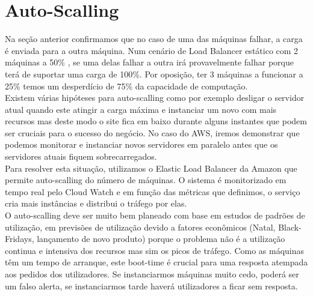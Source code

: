 \section{Auto-Scalling}
Na seção anterior confirmamos que no caso de uma das máquinas falhar, a carga é enviada para a outra máquina. Num cenário de Load Balancer estático com  2 máquinas a 50\% , se uma delas falhar a outra irá provavelmente falhar porque terá de suportar uma carga de 100\%. Por oposição, ter 3 máquinas a funcionar a 25\% temos um desperdício de 75\% da capacidade de computação.\\
Existem várias hipóteses para auto-scalling como por exemplo desligar o servidor atual quando este atingir a carga máxima e instanciar um novo com mais recursos mas deste modo o site fica em baixo durante alguns instantes que podem ser cruciais para o sucesso do negócio. No caso do AWS, iremos demonstrar que podemos monitorar e instanciar novos servidores em paralelo antes que os servidores atuais fiquem sobrecarregados. \\
Para resolver esta situação, utilizamos o Elastic Load Balancer da Amazon que permite auto-scalling do número de máquinas. O sistema é monitorizado em tempo real pelo 
Cloud Watch e em função das métricas que definimos, o serviço cria mais instâncias e distribui o tráfego por elas.\\
O auto-scalling deve ser muito bem planeado com base em estudos de padrões de utilização, em previsões de utilização devido a fatores econômicos (Natal, Black-Fridays, lançamento de novo produto) porque o problema não é a utilização continua e intensiva dos recursos mas sim os picos de tráfego. Como as máquinas têm um tempo de arranque, este boot-time é crucial para uma resposta atempada aos pedidos dos utilizadores. Se instanciarmos máquinas muito cedo, poderá ser um falso alerta, se instanciarmos tarde haverá utilizadores a ficar sem resposta.\\


